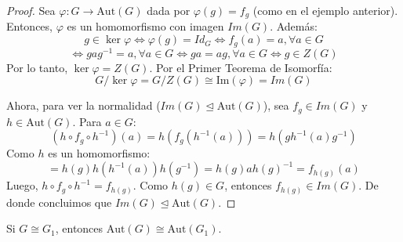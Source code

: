 \begin{proof}
    Sea $\varphi: G \to \text{Aut}(G)$ dada por $\varphi(g) = f_g$ (como en el ejemplo anterior).
    Entonces, $\varphi$ es un homomorfismo con imagen $Im(G)$.
    Además:
    \begin{equation*}
        g \in \ker \varphi \iff \varphi(g) = Id_G \iff f_g(a) = a, \forall a \in G
    \end{equation*}
    \begin{equation*}
        \iff gag^{-1} = a, \forall a \in G \iff ga = ag, \forall a \in G \iff g \in Z(G)
    \end{equation*}
    Por lo tanto, $\ker \varphi = Z(G)$. Por el Primer Teorema de Isomorfía:
    \begin{equation*}
        G / \ker \varphi = G/Z(G) \cong \text{Im}(\varphi) = Im(G)
    \end{equation*}
    
    Ahora, para ver la normalidad ($Im(G) \trianglelefteq \text{Aut}(G)$), sea $f_g \in Im(G)$ y $h \in \text{Aut}(G)$. Para $a \in G$:
    \begin{equation*}
        (h \circ f_g \circ h^{-1})(a) = h(f_g(h^{-1}(a))) = h(g h^{-1}(a) g^{-1})
    \end{equation*}
    Como $h$ es un homomorfismo:
    \begin{equation*}
        = h(g) h(h^{-1}(a)) h(g^{-1}) = h(g) a h(g)^{-1} = f_{h(g)}(a)
    \end{equation*}
    Luego, $h \circ f_g \circ h^{-1} = f_{h(g)}$. Como $h(g) \in G$, entonces $f_{h(g)} \in Im(G)$.
    De donde concluimos que $Im(G) \trianglelefteq \text{Aut}(G)$.
\end{proof}

\begin{obs}
    Si $G \cong G_1$, entonces $\text{Aut}(G) \cong \text{Aut}(G_1)$.
\end{obs}


